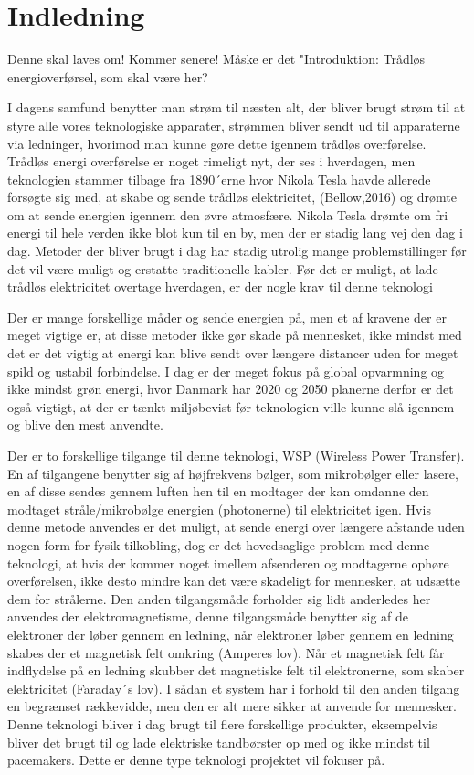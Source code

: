 \chapter{Indledning}
{\color{red} Denne skal laves om! Kommer senere!} Måske er det "Introduktion: Trådløs energioverførsel, som skal være her?

I dagens samfund benytter man strøm til næsten alt, der bliver brugt strøm til at styre alle vores teknologiske apparater, strømmen bliver sendt ud til apparaterne via ledninger, hvorimod man kunne gøre dette igennem trådløs overførelse. Trådløs energi overførelse er noget rimeligt nyt, der ses i hverdagen, men teknologien stammer tilbage fra 1890´erne hvor Nikola Tesla havde allerede forsøgte sig med, at skabe og sende trådløs elektricitet, (Bellow,2016) og drømte om at sende energien igennem den øvre atmosfære. Nikola Tesla drømte om fri energi til hele verden ikke blot kun til en by, men der er stadig lang vej den dag i dag. Metoder der bliver brugt i dag har stadig utrolig mange problemstillinger før det vil være muligt og erstatte traditionelle kabler. Før det er muligt, at lade trådløs elektricitet overtage hverdagen, er der nogle krav til denne teknologi 

Der er mange forskellige måder og sende energien på, men et af kravene der er meget vigtige er, at disse metoder ikke gør skade på mennesket, ikke mindst med det er det vigtig at energi kan blive sendt over længere distancer uden for meget spild og ustabil forbindelse. I dag er der meget fokus på global opvarmning og ikke mindst grøn energi, hvor Danmark har 2020 og 2050 planerne derfor er det også vigtigt, at der er tænkt miljøbevist før teknologien ville kunne slå igennem og blive den mest anvendte.

Der er to forskellige tilgange til denne teknologi, WSP (Wireless Power Transfer). En af tilgangene benytter sig af højfrekvens bølger, som mikrobølger eller lasere, en af disse sendes gennem luften hen til en modtager der kan omdanne den modtaget stråle/mikrobølge energien (photonerne) til elektricitet igen. Hvis denne metode anvendes er det muligt, at sende energi over længere afstande uden nogen form for fysik tilkobling, dog er det hovedsaglige problem med denne teknologi, at hvis der kommer noget imellem afsenderen og modtagerne ophøre overførelsen, ikke desto mindre kan det være skadeligt for mennesker, at udsætte dem for strålerne. Den anden tilgangsmåde forholder sig lidt anderledes her anvendes der elektromagnetisme, denne tilgangsmåde benytter sig af de elektroner der løber gennem en ledning, når elektroner løber gennem en ledning skabes der et magnetisk felt omkring (Amperes lov).  Når et magnetisk felt får indflydelse på en ledning skubber det magnetiske felt  til elektronerne, som skaber elektricitet (Faraday´s lov). I sådan et system har i forhold til den anden tilgang en begrænset rækkevidde, men den er alt mere sikker at anvende for mennesker. Denne teknologi bliver i dag brugt til flere forskellige produkter, eksempelvis bliver det brugt til og lade elektriske tandbørster op med og ikke mindst til pacemakers. Dette er denne type teknologi projektet vil fokuser på. 
